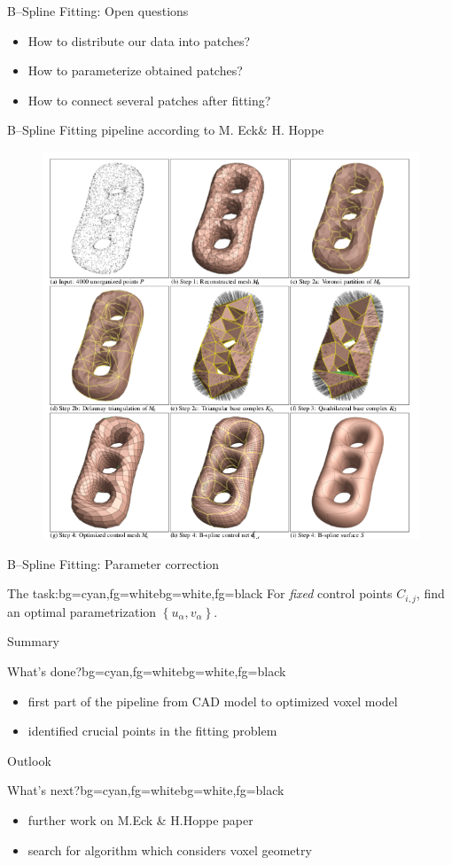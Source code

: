 \begin{frame}{B--Spline Fitting: Open questions}
\begin{itemize}
\item How to distribute our data into patches?
\item How to parameterize obtained patches?
\item How to connect several patches after fitting?
\end{itemize}
\end{frame}

\begin{frame}{B--Spline Fitting pipeline according to M. Eck\& H. Hoppe}
\begin{figure}
\includegraphics[width=0.625\linewidth]{Pictures/HoppePipeline.png}
\end{figure}
\end{frame}

\begin{frame}{B--Spline Fitting: Parameter correction}
\begin{variableblock}{The task:}{bg=cyan,fg=white}{bg=white,fg=black}
For \textit{fixed} control points $C_{i,j}$, find an optimal parametrization $\left\lbrace u_\alpha,v_\alpha \right\rbrace$.
\end{variableblock}

\end{frame}

\begin{frame}{Summary}
\begin{variableblock}{What's done?}{bg=cyan,fg=white}{bg=white,fg=black}
\begin{itemize}
\item first part of the pipeline from CAD model to optimized voxel model
\item identified crucial points in the fitting problem
\end{itemize}
\end{variableblock}
\end{frame}

\begin{frame}{Outlook}
\begin{variableblock}{What's next?}{bg=cyan,fg=white}{bg=white,fg=black}
\begin{itemize}
\item further work on M.Eck \& H.Hoppe paper
\item search for algorithm which considers voxel geometry
\end{itemize}
\end{variableblock}
\end{frame}
